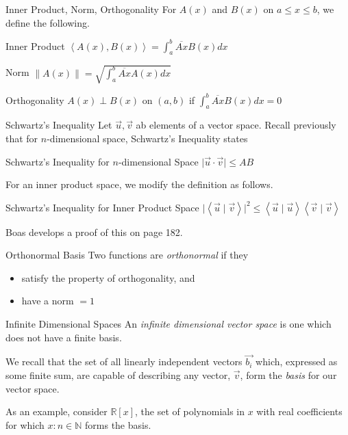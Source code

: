 \documentclass{beamer}
\begin{document}
\begin{frame}{Inner Product, Norm, Orthogonality}
    For $A(x)$ and $B(x)$ on $a\leq x\leq b$, we define the following.
    \begin{block}{Inner Product}
        $\left <A(x), B(x) \right > = \int_a^b \overline{Ax}B(x)dx$
    \end{block}
    \begin{block}{Norm}
        $\lVert A(x)\rVert = \sqrt{\int_a^b \overline{Ax}A(x)dx}$
    \end{block}
    \begin{block}{Orthogonality}
        $A(x)\perp B(x)$ on $(a,b)$ if $\int_a^b \overline{Ax}B(x)dx=0$
    \end{block}
\end{frame}

\begin{frame}{Schwartz's Inequality}
    Let $\vec{u}, \vec{v}$ ab elements of a vector space.  Recall previously that for $n$-dimensional space, Schwartz's Inequality states
    \begin{block}{Schwartz's Inequality for $n$-dimensional Space}
        $\lvert\vec{u}\cdot\vec{v}\rvert\leq AB$
    \end{block}
    For an inner product space, we modify the definition as follows.
    \begin{block}{Schwartz's Inequality for Inner Product Space}
        $\lvert\left<\vec{u}\mid\vec{v}\right>\rvert^2\leq\left<\vec{u}\mid\vec{u}\right>\left<\vec{v}\mid\vec{v}\right>$
    \end{block}
    Boas develops a proof of this on page 182.
\end{frame}

\begin{frame}{Orthonormal Basis}
    Two functions are \emph{orthonormal} if they
    \begin{itemize}
        \item satisfy the property of orthogonality, and
        \item have a norm $= 1$
    \end{itemize}
\end{frame}

\begin{frame}{Infinite Dimensional Spaces}
    An \emph{infinite dimensional vector space} is one which does not have a finite basis.
    \par We recall that the set of all linearly independent vectors $\vec{b_i}$ which, expressed as some finite sum, are capable of describing any vector, $\vec{v}$, form the \emph{basis} for our vector space.
    \par As an example, consider $\mathbb{R}[x]$, the set of polynomials in $x$ with real coefficients for which ${x:n\in\mathbb{N}}$ forms the basis.
\end{frame}
\end{document}
